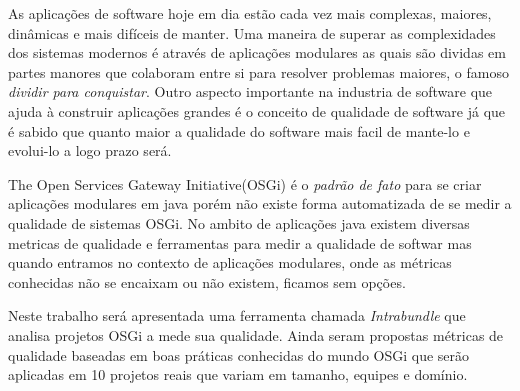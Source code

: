 \begin{englishabstract}{}
As aplicações de software hoje em dia estão cada vez mais complexas, maiores, dinâmicas e mais difíceis de manter. Uma maneira de superar as complexidades dos sistemas modernos é através de aplicações modulares as quais são dividas em partes manores que colaboram entre si para resolver problemas maiores, o famoso \emph{dividir para conquistar}. Outro aspecto importante na industria de software que ajuda à construir aplicações grandes é o conceito de qualidade de software já que é sabido que quanto maior a qualidade do software mais facil de mante-lo e evolui-lo a logo prazo será.

The Open Services Gateway Initiative(OSGi) é o \emph{padrão de fato} para se criar aplicações modulares em java porém não existe forma automatizada de se medir a qualidade de sistemas OSGi. No ambito de aplicações java existem diversas metricas de qualidade e ferramentas para medir a qualidade de softwar mas quando entramos no contexto de aplicações modulares, onde as métricas conhecidas não se encaixam ou não existem, ficamos sem opções. 

Neste trabalho será apresentada uma ferramenta chamada \emph{Intrabundle} que analisa projetos OSGi a mede sua qualidade. Ainda seram propostas métricas de qualidade baseadas em boas práticas conhecidas do mundo OSGi que serão aplicadas em 10 projetos reais que variam em tamanho, equipes e domínio.
\end{englishabstract}
